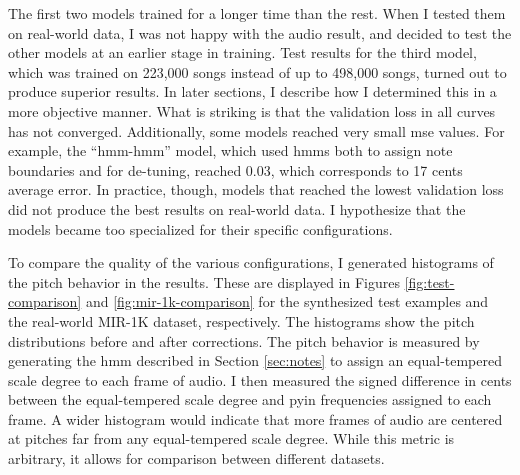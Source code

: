The first two models trained for a longer time than the rest. When I tested them on real-world data, I was not happy with the audio result, and decided to test the other models at an earlier stage in training. Test results for the third model, which was trained on 223,000 songs instead of up to 498,000 songs, turned out to produce superior results. In later sections, I describe how I determined this in a more objective manner. What is striking is that the validation loss in all curves has not converged. Additionally, some models reached very small \gls{mse} values. For example, the ``\gls{hmm}-\gls{hmm}'' model, which used \gls{hmm}s both to assign note boundaries and for de-tuning, reached 0.03, which corresponds to 17 cents average error. In practice, though, models that reached the lowest validation loss did not produce the best results on real-world data. I hypothesize that the models became too specialized for their specific configurations. 

To compare the quality of the various configurations, I generated histograms of the pitch behavior in the results. These are displayed in Figures \ref{fig:test-comparison} and \ref{fig:mir-1k-comparison} for the synthesized test examples and the real-world MIR-1K dataset, respectively. The histograms show the pitch distributions before and after corrections. The pitch behavior is measured by generating the \gls{hmm} described in Section \ref{sec:notes} to assign an equal-tempered scale degree to each frame of audio. I then measured the signed difference in cents between the equal-tempered scale degree and \gls{pyin} frequencies assigned to each frame. A wider histogram would indicate that more frames of audio are centered at pitches far from any equal-tempered scale degree. While this metric is arbitrary, it allows for comparison between different datasets.

